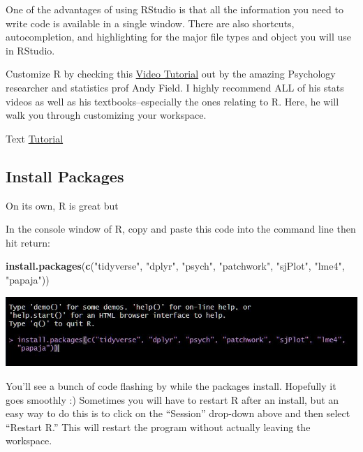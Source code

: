 \documentclass[
]{html}
\newenvironment{Shaded}{\begin{snugshade}}{\end{snugshade}}
\newcommand{\FunctionTok}[1]{\textcolor[rgb]{0.13,0.29,0.53}{\textbf{#1}}}
\newcommand{\NormalTok}[1]{#1}
\newcommand{\StringTok}[1]{\textcolor[rgb]{0.31,0.60,0.02}{#1}}
\theoremstyle{definition}
\theoremstyle{definition}
\theoremstyle{definition}
\theoremstyle{definition}
\theoremstyle{remark}
\begin{document}
One of the advantages of using RStudio is that all the information you need to write code is available in a single window. There are also shortcuts, autocompletion, and highlighting for the major file types and object you will use in RStudio.

Customize R by checking this \href{https://www.youtube.com/watch?v=jAHJyeOqe24}{Video Tutorial} out by the amazing Psychology researcher and statistics prof Andy Field. I highly recommend ALL of his stats videos as well as his textbooks--especially the ones relating to R. Here, he will walk you through customizing your workspace.

Text \href{https://support.posit.co/hc/en-us/articles/200549016-Customizing-the-RStudio-IDE}{Tutorial}

\hypertarget{install-packages}{%
\subsection{Install Packages}\label{install-packages}}

On its own, R is great but

In the console window of R, copy and paste this code into the command line then hit return:

\begin{Shaded}
\begin{Highlighting}[]
\FunctionTok{install.packages}\NormalTok{(}\FunctionTok{c}\NormalTok{(}\StringTok{"tidyverse"}\NormalTok{, }\StringTok{"dplyr"}\NormalTok{, }\StringTok{"psych"}\NormalTok{, }\StringTok{"patchwork"}\NormalTok{, }\StringTok{"sjPlot"}\NormalTok{, }\StringTok{"lme4"}\NormalTok{, }\StringTok{"papaja"}\NormalTok{))}
\end{Highlighting}
\end{Shaded}

\includegraphics{images/installpackages.JPG}

You'll see a bunch of code flashing by while the packages install. Hopefully it goes smoothly :) Sometimes you will have to restart R after an install, but an easy way to do this is to click on the ``Session'' drop-down above and then select ``Restart R.'' This will restart the program without actually leaving the workspace.
\end{document}
